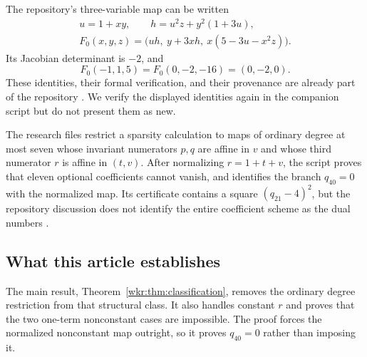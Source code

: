 \documentclass[11pt,a4paper]{article}
\numberwithin{equation}{section}
\theoremstyle{definition}
\theoremstyle{remark}
\begin{document}
The repository's three-variable map can be written
\begin{equation}\label{wkr:eq:original}
\begin{gathered}
u=1+xy,\qquad h=u^2z+y^2(1+3u),\\
F_0(x,y,z)=\bigl(uh,\ y+3xh,\ x(5-3u-x^2z)\bigr).
\end{gathered}
\end{equation}
Its Jacobian determinant is $-2$, and
\begin{equation}\label{wkr:eq:oldcollision}
F_0(-1,1,5)=F_0(0,-2,-16)=(0,-2,0).
\end{equation}
These identities, their formal verification, and their provenance are
already part of the repository \cite{repo-main}. We verify the displayed
identities again in the companion script but do not present them as new.

The research files restrict a sparsity calculation to maps of ordinary
degree at most seven whose invariant numerators $p,q$ are affine in $v$ and
whose third numerator $r$ is affine in $(t,v)$. After normalizing
$r=1+t+v$, the script proves that eleven optional coefficients cannot vanish,
and identifies the branch $q_{40}=0$ with the normalized map. Its certificate
contains a square $(q_{21}-4)^2$, but the repository discussion does not
identify the entire coefficient scheme as the dual numbers
\cite{repo-research,repo-sparsity}.

\subsection{What this article establishes}

The main result, Theorem~\ref{wkr:thm:classification}, removes the ordinary
degree restriction from that structural class. It also handles constant
$r$ and proves that the two one-term nonconstant cases are impossible. The
proof forces the normalized nonconstant map outright, so it proves
$q_{40}=0$ rather than imposing it.
\end{document}
